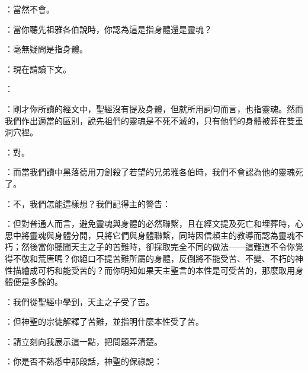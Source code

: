 ：當然不會。\par

：當你聽先祖雅各伯說時，你認為這是指身體還是靈魂？\par

：毫無疑問是指身體。\par

：現在請讀下文。\par

：\par

：剛才你所讀的經文中，聖經沒有提及身體，但就所用詞句而言，也指靈魂。然而我們作出適當的區別，說先祖們的靈魂是不死不滅的，只有他們的身體被葬在雙重洞穴裡。\par

：對。\par

：而當我們讀中黑落德用刀劍殺了若望的兄弟雅各伯時，我們不會認為他的靈魂死了。\par

：不，我們怎能這樣想？我們記得主的警告：\par

：但對普通人而言，避免靈魂與身體的必然聯繫，且在經文提及死亡和埋葬時，心思中將靈魂與身體分開，只將它們與身體聯繫，同時因信賴主的教導而認為靈魂不朽；然後當你聽聞天主之子的苦難時，卻採取完全不同的做法——這難道不令你覺得不敬和荒唐嗎？你絕口不提苦難所屬的身體，反倒將不能受苦、不變、不朽的神性描繪成可朽和能受苦的？而你明知如果天主聖言的本性是可受苦的，那麼取用身體便是多餘的。\par

：我們從聖經中學到，天主之子受了苦。\par

：但神聖的宗徒解釋了苦難，並指明什麼本性受了苦。\par

：請立刻向我展示這一點，把問題弄清楚。\par

：你是否不熟悉中那段話，神聖的保祿說：\par

